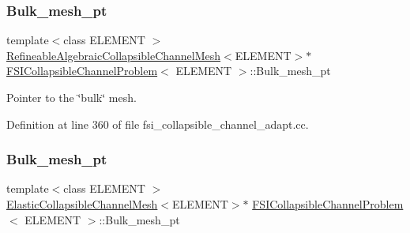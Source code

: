 \mbox{\label{classFSICollapsibleChannelProblem_aa0da71e3534daa79c0c4c2e6dbc6338c}} 
\subsubsection{\texorpdfstring{Bulk\+\_\+mesh\+\_\+pt}{Bulk\_mesh\_pt}\hspace{0.1cm}{\footnotesize\ttfamily [4/6]}}
{\footnotesize\ttfamily template$<$class E\+L\+E\+M\+E\+NT $>$ \\
\hyperlink{classoomph_1_1RefineableAlgebraicCollapsibleChannelMesh}{Refineable\+Algebraic\+Collapsible\+Channel\+Mesh}$<$E\+L\+E\+M\+E\+NT$>$$\ast$ \hyperlink{classFSICollapsibleChannelProblem}{F\+S\+I\+Collapsible\+Channel\+Problem}$<$ E\+L\+E\+M\+E\+NT $>$\+::Bulk\+\_\+mesh\+\_\+pt\hspace{0.3cm}{\ttfamily [private]}}



Pointer to the \char`\"{}bulk\char`\"{} mesh. 



Definition at line 360 of file fsi\+\_\+collapsible\+\_\+channel\+\_\+adapt.\+cc.

\mbox{\label{classFSICollapsibleChannelProblem_a73b35b23f07b5f79e288064c2e62e1ac}} 
\subsubsection{\texorpdfstring{Bulk\+\_\+mesh\+\_\+pt}{Bulk\_mesh\_pt}\hspace{0.1cm}{\footnotesize\ttfamily [5/6]}}
{\footnotesize\ttfamily template$<$class E\+L\+E\+M\+E\+NT $>$ \\
\hyperlink{classElasticCollapsibleChannelMesh}{Elastic\+Collapsible\+Channel\+Mesh}$<$E\+L\+E\+M\+E\+NT$>$$\ast$ \hyperlink{classFSICollapsibleChannelProblem}{F\+S\+I\+Collapsible\+Channel\+Problem}$<$ E\+L\+E\+M\+E\+NT $>$\+::Bulk\+\_\+mesh\+\_\+pt\hspace{0.3cm}{\ttfamily [private]}}



